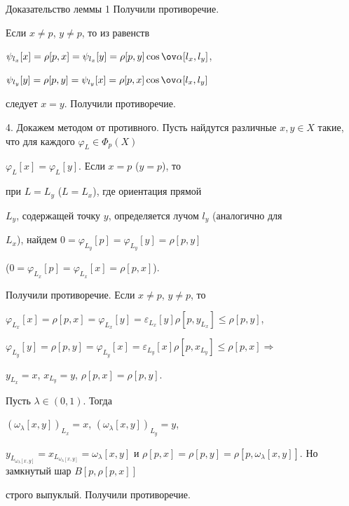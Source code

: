 \begin{pf*}{Доказательство леммы 1}
Получили противоречие.


Если $x \neq  p$, $y \neq p$, то из равенств


$\psi _{l_{x}}[x] = \rho[p,x] = \psi _{l_{x}}[y] =


 \rho[p,y]\cos \ov \alpha[l_{x},l_{y}]$,


$\psi _{l_{y}}[y] = \rho[p,y] = \psi _{l_{y}}[x] =


\rho[p,x]\cos \ov \alpha[l_{x},l_{y}]$


следует $x=y$. Получили противоречие.


\smallskip





4. Докажем методом от противного. Пусть найдутся различные $x, y


\in X$ такие, что для каждого $\varphi _{L} \in \Phi _{p}(X)$


$\varphi _{L}[x] = \varphi _{L}[y]$. Если $x = p$ ($y = p$), то


при $L = L_{y}$ ($L = L_{x}$), где ориентация прямой


$L_{y}$, содержащей точку $y$, определяется лучом $l_{y}$ (аналогично для


$L_{x}$), найдем $0 = \varphi _{L_{y}}[p] = \varphi _{L_{y}}[y] = \rho[p,y]$


($0 = \varphi _{L_{x}}[p] = \varphi _{L_{x}}[x] = \rho[p,x]$). 


Получили противоречие. Если $x \neq  p$, $y \neq p$, то


$\varphi _{L_{x}}[x] = \rho[p,x] = \varphi _{L_{x}}[y] =


\varepsilon_{L_{x}}[y] \rho[p,y_{L_{x}}] \leq \rho[p,y]$,


$\varphi _{L_{y}}[y] = \rho[p,y] =\varphi _{L_{y}}[x] =


\varepsilon_{L_{y}}[x] \rho[p,x_{L_{y}}] \leq \rho[p,x] \Rightarrow $


$y_{L_{x}} =x$, $x_{L_{y}}=y$, $\rho[p,x] = \rho[p,y]$.


Пусть $\lambda \in (0,1)$. Тогда


$(\omega_{\lambda}[x,y])_{L_{x}}=x$, $(\omega_{\lambda}[x,y])_{L_{y}}=y$,


$y_{L_{\omega_{\lambda}[x,y]}} = x_{L_{\omega_{\lambda}[x,y]}} =


\omega_{\lambda}[x,y]$ и $\rho[p,x] = \rho[p,y] =


\rho[p,\omega_{\lambda}[x,y]]$. Но замкнутый шар $B[p,\rho[p,x]]$


строго выпуклый. Получили противоречие.


\end{pf*}





